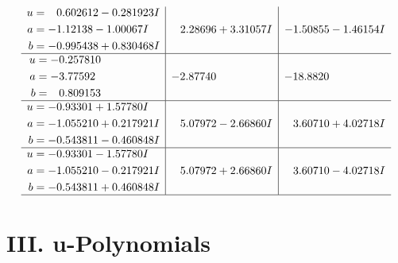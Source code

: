 \documentclass[1p]{elsarticle_modified}
\theoremstyle{definition}
\begin{document}
$$\begin{array}{c|c|c}
\begin{aligned}
u &= \phantom{-}0.602612 - 0.281923 I \\
a &= -1.12138 - 1.00067 I \\
b &= -0.995438 + 0.830468 I\end{aligned}
 & \phantom{-}2.28696 + 3.31057 I & -1.50855 - 1.46154 I \\ \hline\begin{aligned}
u &= -0.257810\phantom{ +0.000000I} \\
a &= -3.77592\phantom{ +0.000000I} \\
b &= \phantom{-}0.809153\phantom{ +0.000000I}\end{aligned}
 & -2.87740\phantom{ +0.000000I} & -18.8820\phantom{ +0.000000I} \\ \hline\begin{aligned}
u &= -0.93301 + 1.57780 I \\
a &= -1.055210 + 0.217921 I \\
b &= -0.543811 - 0.460848 I\end{aligned}
 & \phantom{-}5.07972 - 2.66860 I & \phantom{-}3.60710 + 4.02718 I \\ \hline\begin{aligned}
u &= -0.93301 - 1.57780 I \\
a &= -1.055210 - 0.217921 I \\
b &= -0.543811 + 0.460848 I\end{aligned}
 & \phantom{-}5.07972 + 2.66860 I & \phantom{-}3.60710 - 4.02718 I\\
 \hline 
 \end{array}$$\newpage
\newpage\renewcommand{\arraystretch}{1}
\centering \section*{ III. u-Polynomials}
\end{document}
